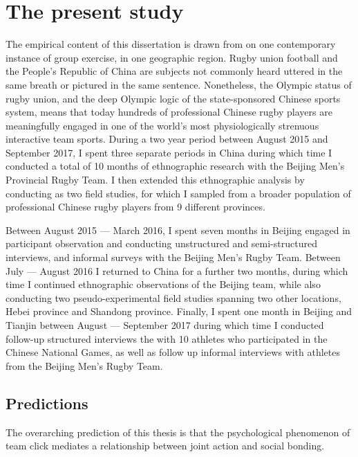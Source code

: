 \section{The present study}
The empirical content of this dissertation is drawn from on one contemporary instance of group exercise, in one geographic region.  Rugby union football and the People's Republic of China are subjects not commonly heard uttered in the same breath or pictured in the same sentence.  Nonetheless, the Olympic status of rugby union, and the deep Olympic logic of the state-sponsored Chinese sports system, means that today hundreds of professional Chinese rugby players are meaningfully engaged in one of the world's most physiologically strenuous interactive team sports.  During a two year period between August 2015 and September 2017, I spent three separate periods in China during which time I conducted a total of 10 months of ethnographic research with the Beijing Men's Provincial Rugby Team.  I then extended this ethnographic analysis by conducting as two field studies, for which I sampled from a broader population of professional Chinese rugby players from 9 different provinces.

Between August 2015 --- March 2016, I spent seven months in Beijing engaged in participant observation and conducting unstructured and semi-structured interviews, and informal surveys with the Beijing Men's Rugby Team. Between July --- August 2016 I returned to China for a further two months, during which time I continued ethnographic observations of the Beijing team, while also conducting two pseudo-experimental field studies spanning two other locations, Hebei province and Shandong province. Finally, I spent one month in Beijing and Tianjin between August --- September 2017 during which time I conducted follow-up structured interviews the with 10 athletes who participated in the Chinese National Games, as well as follow up informal interviews with athletes from the Beijing Men's Rugby Team.


\subsection{Predictions}

The overarching prediction of this thesis is that the psychological phenomenon of team click mediates a relationship between joint action and social bonding.


